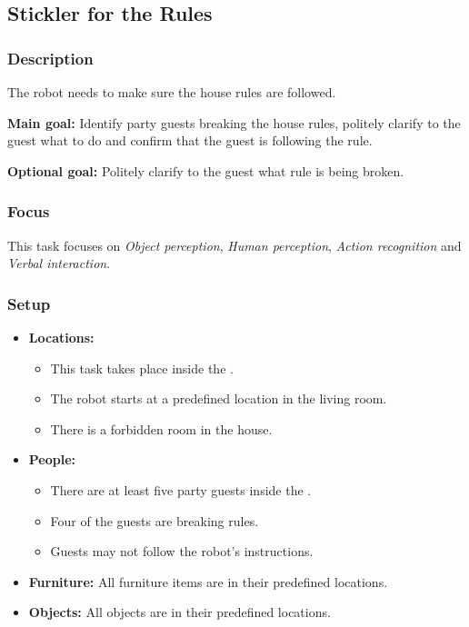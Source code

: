 \subsection{Stickler for the Rules}
\label{test:stickler-for-the-rules}

\subsubsection*{Description}
The robot needs to make sure the house rules are followed.

\textbf{Main goal:}
Identify party guests breaking the house rules, politely clarify to the guest what to do and confirm that the guest is following the rule.

\textbf{Optional goal:}
Politely clarify to the guest what rule is being broken.


\subsubsection*{Focus}
This task focuses on
\textit{Object perception},
\textit{Human perception},
\textit{Action recognition} and
\textit{Verbal interaction}.

\subsubsection*{Setup}
\begin{itemize}[nosep]	
	\item \textbf{Locations:} 
	\begin{itemize}
		\item This task takes place inside the \Arena{}.
		\item The robot starts at a predefined location in the living room.
		\item There is a forbidden room in the house.
	\end{itemize}	 
	\item \textbf{People:} 
	\begin{itemize}
		\item There are at least five party guests inside the \Arena{}.
		\item Four of the guests are breaking rules.
		\item Guests may not follow the robot's instructions.
	\end{itemize}
	\item \textbf{Furniture:} All furniture items are in their predefined locations.
	\item \textbf{Objects:} All objects are in their predefined locations.
\end{itemize}

